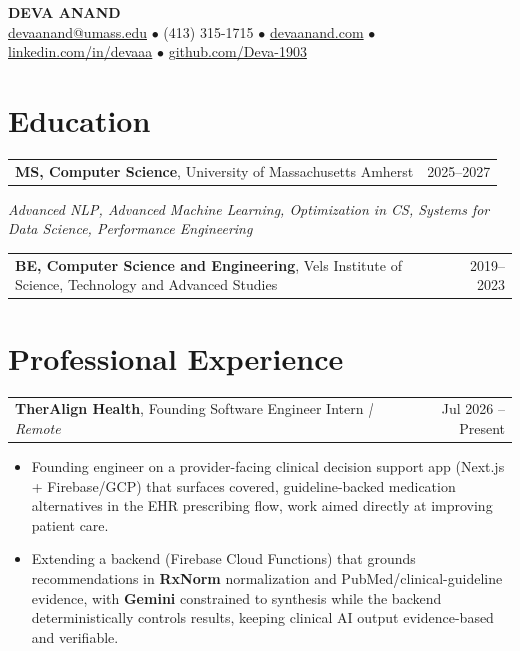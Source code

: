 \documentclass[letterpaper,11pt]{article}
\makeatletter
\newcommand{\eduItem}[3]{%
  \begin{tabular*}{\textwidth}{@{}l@{\extracolsep{\fill}}r@{}}
    \textbf{#1}, #2 & #3 \\
  \end{tabular*}\par
}
\newcommand{\expItem}[4]{%
  \vspace{2pt}
  \begin{tabular*}{\textwidth}{@{}l@{\extracolsep{\fill}}r@{}}
    \textbf{#1}, #2 \textit{| #3} & #4 \\
  \end{tabular*}\par\vspace{-3pt}
}
\makeatother
\begin{document}
\begin{center}
    {\fontsize{18}{20}\selectfont\bfseries DEVA ANAND}\\ \vspace{3pt}
    {\small
    \href{mailto:devaanand@umass.edu}{devaanand@umass.edu}
    \enspace$\bullet$\enspace
    (413) 315-1715
    \enspace$\bullet$\enspace
    \href{https://devaanand.com}{devaanand.com}
    \enspace$\bullet$\enspace
    \href{https://linkedin.com/in/devaaa/}{linkedin.com/in/devaaa}
    \enspace$\bullet$\enspace
    \href{https://github.com/Deva-1903}{github.com/Deva-1903}}
\end{center}
\vspace{-8pt}

\section{Education}
\eduItem{MS, Computer Science}{University of Massachusetts Amherst}{2025--2027}
{\small\textit{Advanced NLP, Advanced Machine Learning, Optimization in CS, Systems for Data Science, Performance Engineering}}\par
\vspace{3pt}
\eduItem{BE, Computer Science and Engineering}{Vels Institute of Science, Technology and Advanced Studies}{2019--2023}

\section{Professional Experience}

\expItem{TherAlign Health}{Founding Software Engineer Intern}{Remote}{Jul 2026 -- Present}
\begin{itemize}
  \item Founding engineer on a provider-facing clinical decision support app (Next.js + Firebase/GCP) that surfaces covered, guideline-backed medication alternatives in the EHR prescribing flow, work aimed directly at improving patient care.
  \item Extending a backend (Firebase Cloud Functions) that grounds recommendations in \textbf{RxNorm} normalization and PubMed/clinical-guideline evidence, with \textbf{Gemini} constrained to synthesis while the backend deterministically controls results, keeping clinical AI output evidence-based and verifiable.
\end{itemize}
\end{document}
